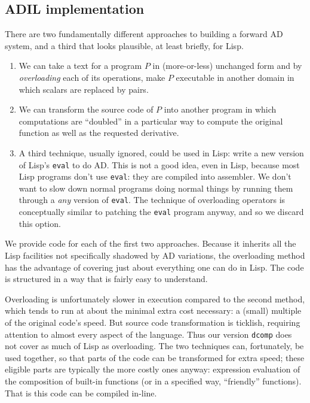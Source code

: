 \documentclass{article}
\begin{document}
\subsection{ADIL implementation}
There are two fundamentally different
approaches to building a forward AD system, and a third that looks plausible,
at least briefly, for Lisp.
\begin{enumerate}
\item We can take a text for a program $P$ in (more-or-less) unchanged form and by
{\em overloading} each of its operations, make $P$ executable in another
domain in which scalars are replaced by pairs.
\item We can transform the source code of $P$ into another program in which
computations are ``doubled'' in a particular way to compute the original
function as well as the requested derivative.
\item A third technique, usually ignored, could be used in Lisp: write
a new version of Lisp's {\tt eval} to do AD. This is not a good idea,
even in Lisp, because most Lisp programs don't use {\tt eval}: they are
compiled into assembler.  We don't want to slow down normal
programs doing normal things by running them through a
{\em any} version of {\tt eval}.
The technique of overloading operators
is conceptually similar to patching the {\tt eval} program anyway, and
so we discard this option.
\end{enumerate}

We provide code for each of the first two approaches.  Because it
inherits all the Lisp facilities not specifically shadowed by AD
variations, the overloading method has the advantage of covering just
about everything one can do in Lisp. The code is structured in a way
that is fairly easy to understand.

Overloading is unfortunately slower in execution compared to
the second method, which tends to run at about the minimal
extra cost necessary: a (small) multiple of the
original code's speed.  But source code transformation is ticklish,
requiring attention to almost every aspect of the language. Thus our
version {\tt dcomp} does not cover as much of Lisp as overloading.
The two techniques can, fortunately, be used together, so that parts
of the code can be transformed for extra speed; these eligible parts are typically
the more costly ones anyway:
expression evaluation of the composition of
built-in functions (or in a specified way, ``friendly'' functions). That
is this code can be compiled in-line.
\end{document}
